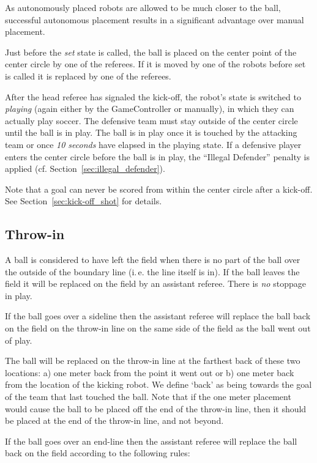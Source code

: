 \documentclass[12pt]{article}
\newcommand{\ie}{\mbox{i.\,e.}\xspace}
\newcommand{\cf}{\mbox{cf.}\xspace}
\begin{document}
As autonomously placed robots are allowed to be much closer to the ball, successful autonomous placement results in a significant advantage over manual placement.

Just before the \emph{set} state is called, the ball is placed on the center point of the center circle by one of the referees. If it is moved by one of the robots before set is called it is replaced by one of the referees.

After the head referee has signaled the kick-off, the robot's state is switched to \emph{playing} (again either by the GameController or manually), in which they can actually play soccer.
The defensive team must stay outside of the center circle until the ball is in play.  The ball is in play once it is touched by the attacking team or once \emph{10 seconds} have elapsed in the playing state. If a defensive player enters the center circle before the ball is in play, the ``Illegal Defender'' penalty is applied (\cf Section~\ref{sec:illegal_defender}).

Note that a goal can never be scored from within the center circle after a kick-off. See Section~\ref{sec:kick-off_shot} for details.

\subsection{Throw-in}
\label{sec:throw_in}

A ball is considered to have left the field when there is no part of the ball over the outside of the boundary line (\ie the line itself is in). If the ball leaves the field it will be replaced on the field by an assistant referee. There is \emph{no} stoppage in play.

If the ball goes over a sideline then the assistant referee will replace the ball back on the field on the throw-in line on the same side of the field as the ball went out of play.

The ball will be replaced on the throw-in line at the farthest back of these two locations: a) one meter back from the point it went out or b) one meter back from the location of the kicking robot. We define `back' as being towards the goal of the team that last touched the ball. Note that if the one meter placement would cause the ball to be placed off the end of the throw-in line, then it should be placed at the end of the throw-in line, and not beyond.

If the ball goes over an end-line then the assistant referee will replace the ball back on the field according to the following rules:
\end{document}
